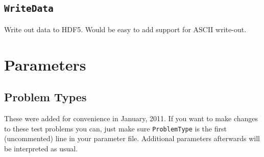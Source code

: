 \documentclass[letterpaper,titlepage,12pt]{article}
\numberwithin{equation}{section}
\begin{document}
\subsection{\texttt{WriteData}}
Write out data to HDF5.  Would be easy to add support for ASCII write-out.

\section{Parameters} \label{sec:Parameters}

\subsection{Problem Types}
These were added for convenience in January, 2011.  If you want to make changes to these test problems you can, just make sure \texttt{ProblemType} is the first (uncommented) line in your parameter file.  Additional parameters afterwards will be interpreted as usual.
\end{document}
